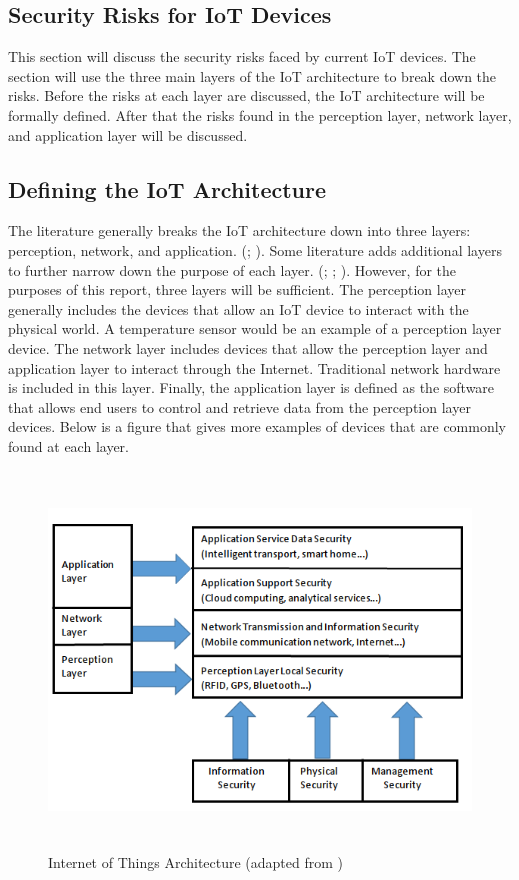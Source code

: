 \documentclass[letterpaper, 12pt]{article}
\begin{document}
\begin{flushleft}
\section*{Security Risks for IoT Devices}

This section will discuss the security risks faced by current IoT devices. The section will use the three main layers of the IoT architecture to break down the risks. Before the risks at each layer are discussed,
the IoT architecture will be formally defined. After that the risks found in the perception layer, network layer, and application layer will be discussed.

\subsection*{Defining the IoT Architecture}
The literature generally breaks the IoT architecture down into three layers: perception, network, and application. (\cite{Zhao6746513}; \cite{Xiaohui6643029}). Some literature adds additional layers to further narrow down the purpose of each
layer. (\cite{Granjal7005393}; \cite{Kozlov}; \cite{Suo6188257}). However, for the purposes of this report, three layers will be sufficient. The perception layer 
generally includes the devices that allow an IoT device to interact with the physical world. A temperature sensor would be an example of a
perception layer device. The network layer includes devices that allow the perception layer and application layer to interact through the Internet.
Traditional network hardware is included in this layer. Finally, the application layer is defined as the software that allows end users to control
and retrieve data from the perception layer devices. Below is a figure that gives more examples of devices that are commonly found at each layer.

\begin{figure}[H]
	\includegraphics[width=\linewidth,height=10cm,keepaspectratio]{figure2_new.png}
	\caption{Internet of Things Architecture (adapted from \cite{Zhao6746513})}
	\label{fig:arch}
\end{figure}


\end{flushleft}
\end{document}
